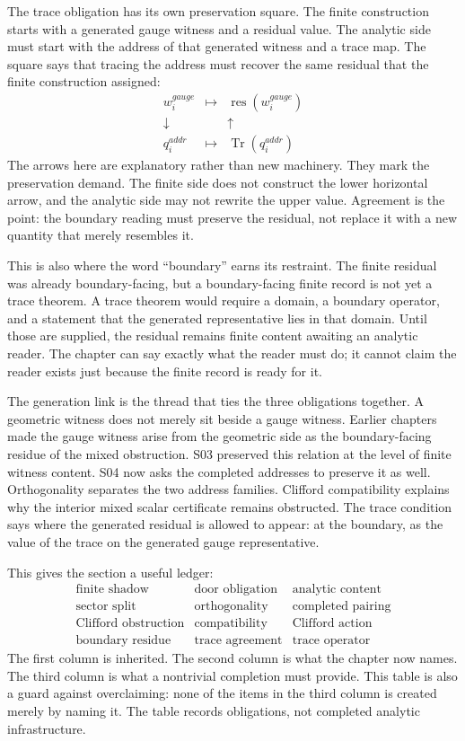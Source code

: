 The trace obligation has its own preservation square. The finite construction
starts with a generated gauge witness and a residual value. The analytic side
must start with the address of that generated witness and a trace map. The
square says that tracing the address must recover the same residual that the
finite construction assigned:
\[
  \begin{array}{ccc}
  w_i^{gauge} & \longmapsto & \operatorname{res}(w_i^{gauge}) \\
  \downarrow & & \uparrow \\
  q_i^{addr} & \longmapsto & \operatorname{Tr}(q_i^{addr})
  \end{array}
\]
The arrows here are explanatory rather than new machinery. They mark the
preservation demand. The finite side does not construct the lower horizontal
arrow, and the analytic side may not rewrite the upper value. Agreement is the
point: the boundary reading must preserve the residual, not replace it with a
new quantity that merely resembles it.

This is also where the word ``boundary'' earns its restraint. The finite
residual was already boundary-facing, but a boundary-facing finite record is
not yet a trace theorem. A trace theorem would require a domain, a boundary
operator, and a statement that the generated representative lies in that
domain. Until those are supplied, the residual remains finite content awaiting
an analytic reader. The chapter can say exactly what the reader must do; it
cannot claim the reader exists just because the finite record is ready for it.

The generation link is the thread that ties the three obligations together. A
geometric witness does not merely sit beside a gauge witness. Earlier chapters
made the gauge witness arise from the geometric side as the boundary-facing
residue of the mixed obstruction. S03 preserved this relation at the level of
finite witness content. S04 now asks the completed addresses to preserve it as
well. Orthogonality separates the two address families. Clifford compatibility
explains why the interior mixed scalar certificate remains obstructed. The
trace condition says where the generated residual is allowed to appear: at the
boundary, as the value of the trace on the generated gauge representative.

This gives the section a useful ledger:
\[
  \begin{array}{c|c|c}
  \text{finite shadow} & \text{door obligation} & \text{analytic content} \\
  \hline
  \text{sector split} & \text{orthogonality} & \text{completed pairing} \\
  \text{Clifford obstruction} & \text{compatibility} & \text{Clifford action} \\
  \text{boundary residue} & \text{trace agreement} & \text{trace operator}
  \end{array}
\]
The first column is inherited. The second column is what the chapter now names.
The third column is what a nontrivial completion must provide. This table is
also a guard against overclaiming: none of the items in the third column is
created merely by naming it. The table records obligations, not completed
analytic infrastructure.

